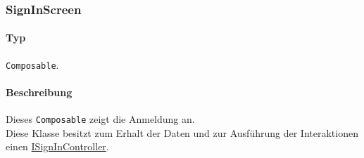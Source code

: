 \subsubsection{SignInScreen}\label{App_Signup_SignInScreen}
\paragraph*{Typ}
\texttt{Composable}.
\paragraph*{Beschreibung}
Dieses \texttt{Composable} zeigt die Anmeldung an.\\
Diese Klasse besitzt zum Erhalt der Daten und zur Ausführung der Interaktionen einen \hyperref[App_Signup_SignInController]{ISignInController}.

